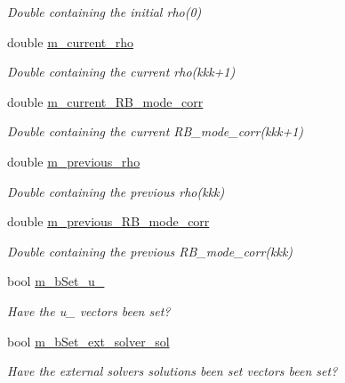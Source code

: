 \begin{DoxyCompactItemize}
\begin{DoxyCompactList}\small\item\em Double containing the initial {\ttfamily rho(0)} \end{DoxyCompactList}\item 
double \hyperlink{classcarl_1_1_f_e_t_i___operations_a1ecd729d4399772a6741c3b4bf69a69a}{m\+\_\+current\+\_\+rho}
\begin{DoxyCompactList}\small\item\em Double containing the current {\ttfamily rho(kkk+1)} \end{DoxyCompactList}\item 
double \hyperlink{classcarl_1_1_f_e_t_i___operations_a22ebb1138a1a8ca2b88d33c17a8fe299}{m\+\_\+current\+\_\+\+R\+B\+\_\+mode\+\_\+corr}
\begin{DoxyCompactList}\small\item\em Double containing the current {\ttfamily R\+B\+\_\+mode\+\_\+corr(kkk+1)} \end{DoxyCompactList}\item 
double \hyperlink{classcarl_1_1_f_e_t_i___operations_af0ebbbb10b8e989a9fc4b3b20c7a2478}{m\+\_\+previous\+\_\+rho}
\begin{DoxyCompactList}\small\item\em Double containing the previous {\ttfamily rho(kkk)} \end{DoxyCompactList}\item 
double \hyperlink{classcarl_1_1_f_e_t_i___operations_ae13cf11dfb8dd3a55742b06d96e0e941}{m\+\_\+previous\+\_\+\+R\+B\+\_\+mode\+\_\+corr}
\begin{DoxyCompactList}\small\item\em Double containing the previous {\ttfamily R\+B\+\_\+mode\+\_\+corr(kkk)} \end{DoxyCompactList}\item 
bool \hyperlink{classcarl_1_1_f_e_t_i___operations_abf724cc3aa790877475fcea5116802b0}{m\+\_\+b\+Set\+\_\+u\+\_}
\begin{DoxyCompactList}\small\item\em Have the u\+\_ vectors been set? \end{DoxyCompactList}\item 
bool \hyperlink{classcarl_1_1_f_e_t_i___operations_af31024ec972af89dff3472ed65086db5}{m\+\_\+b\+Set\+\_\+ext\+\_\+solver\+\_\+sol}
\begin{DoxyCompactList}\small\item\em Have the external solvers solutions been set vectors been set? \end{DoxyCompactList}\item 

\end{DoxyCompactItemize}
